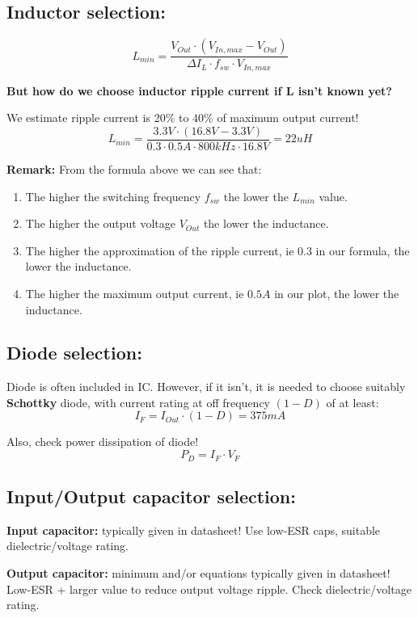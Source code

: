 \subsection{Inductor selection:}
\[ L_{min} = \frac{V_{Out} \cdot (V_{In, max} - V_{Out})}{\Delta I_L \cdot f_{sw} \cdot V_{In, max}} \]

\textbf{But how do we choose inductor ripple current if L isn't known yet?}

We estimate ripple current is 20\% to 40\% of maximum output current!
\[ L_{min} = \frac{3.3V \cdot (16.8V - 3.3V)}{0.3 \cdot 0.5A \cdot 800kHz \cdot 16.8V} = 22uH \]

\textbf{Remark:} From the formula above we can see that:
\begin{enumerate}
	\item 
	The higher the switching frequency $f_{sw}$ the lower the $L_{min}$ value.
	
	\item 
	The higher the output voltage $V_{Out}$ the lower the inductance.
	
	\item 
	The higher the approximation of the ripple current, ie $0.3$ in our formula, the lower the inductance.
	
	\item 
	The higher the maximum output current, ie $0.5A$ in our plot, the lower the inductance.
\end{enumerate}

\subsection{Diode selection:}
Diode is often included in IC. However, if it isn't, it is needed to choose suitably \textbf{Schottky} diode, with current rating at off frequency $(1 - D)$ of at least:
\[ I_F = I_{Out} \cdot (1 - D) = 375mA \]

Also, check power dissipation of diode!
\[ P_D = I_F \cdot V_F \]

\subsection{Input/Output capacitor selection:}
\textbf{Input capacitor:} typically given in datasheet! Use low-ESR caps, suitable dielectric/voltage rating.


\textbf{Output capacitor:} minimum and/or equations typically given in datasheet! Low-ESR + larger value to reduce output voltage ripple. Check dielectric/voltage rating.

